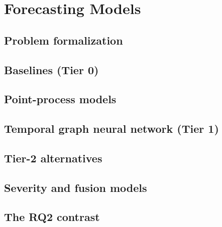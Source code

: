 \section{Forecasting Models}\label{sec:methods}

\subsection{Problem formalization}\label{sec:meth-problem}

\subsection{Baselines (Tier 0)}\label{sec:meth-baselines}

\subsection{Point-process models}\label{sec:meth-hawkes}

\subsection{Temporal graph neural network (Tier 1)}\label{sec:meth-gnn}

\subsection{Tier-2 alternatives}\label{sec:meth-tier2}

\subsection{Severity and fusion models}\label{sec:meth-severity}

\subsection{The RQ2 contrast}\label{sec:meth-rq2}
